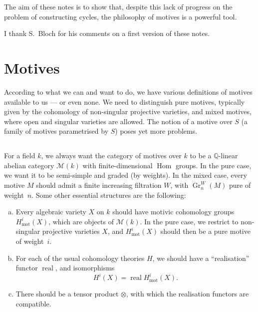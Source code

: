 \documentclass{article}
\theoremstyle{plain}
\theoremstyle{definition}
\newcommand{\sh}[1]{{\mathscr{#1}}}
\newcommand{\QQ}{\mathbb{Q}}
\newcommand{\mot}{\mathrm{mot}}
\DeclareMathOperator{\Hom}{Hom}
\DeclareMathOperator{\real}{real}
\DeclareMathOperator{\Gr}{Gr}
\newcommand{\oldpage}[1]{\marginpar{\footnotesize$\Big\vert$ \textit{p.~#1}}}
\begin{document}
\oldpage{145}
The aim of these notes is to show that, despite this lack of progress on the problem of constructing cycles, the philosophy of motives is a powerful tool.

I thank S.~Bloch for his comments on a first version of these notes.


\section{Motives}
\label{1}

According to what we can and want to do, we have various definitions of motives available to us --- or even none.
We need to distinguish pure motives, typically given by the cohomology of non-singular projective varieties, and mixed motives, where open and singular varieties are allowed.
The notion of a motive over $S$ (a family of motives parametrised by $S$) poses yet more problems.

\subsection{}
\label{1.1}

For a field $k$, we always want the category of motives over $k$ to be a $\QQ$-linear abelian category $\sh{M}(k)$ with finite-dimensional $\Hom$ groups.
In the pure case, we want it to be semi-simple and graded (by weights).
In the mixed case, every motive $M$ should admit a finite increasing filtration $W$, with $\Gr_n^W(M)$ pure of weight~$n$.
Some other essential structures are the following:
\begin{enumerate}[(a)]
  \item Every algebraic variety $X$ on $k$ should have motivic cohomology groups $H_\mot^i(X)$, which are objects of $\sh{M}(k)$.
    In the pure case, we restrict to non-singular projective varieties $X$, and $H_\mot^i(X)$ should then be a pure motive of weight~$i$.
  \item For each of the usual cohomology theories $H$, we should have a ``realisation'' functor $\real$, and isomorphisms
    \[
      H^i(X) = \real H_\mot^i(X).
    \]
  \item There should be a tensor product $\otimes$, with which the realisation functors are compatible.
\end{enumerate}

\subsection{}
\label{1.2}
\end{document}
